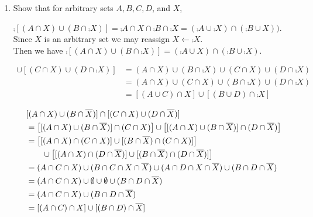 \documentclass[11pt]{book}
\begin{document}
\begin{enumerate}
\item Show that for arbitrary sets $A, B, C, D$, and $X$,
\begin{enumerate}
{$\comp{[(A \cap X) \cup (B \cap \comp{X})]} = \comp{A \cap X} \cap \comp{B \cap \comp{X}} = (\comp{A} \cup \comp{X}) \cap (\comp{B} \cup X))$.\\Since $X$ is an arbitrary set we may reassign $X \leftarrow \comp{X}$.\\Then we have $\comp{[(A \cap X) \cup (B \cap \comp{X})]} = (\comp{A} \cup X) \cap (\comp{B} \cup \comp{X})$.}

{\begin{align*}[(A \cap X) \cup (B \cap \comp{X})] \cup [(C \cap X) \cup (D \cap \comp{X})] &= (A \cap X) \cup (B \cap \comp{X}) \cup (C \cap X) \cup (D \cap \comp{X})\\&= (A \cap X) \cup (C \cap X) \cup (B \cap \comp{X}) \cup (D \cap \comp{X})\\&= [(A \cup C) \cap X] \cup [(B \cup D) \cap \comp{X}]\end{align*}}

{\begin{align*}&[(A \cap X) \cup (B \cap \overline{X})] \cap [(C \cap X) \cup (D \cap \overline{X})]\\ &= \left[[(A \cap X) \cup (B \cap \overline{X})] \cap (C \cap X)\right] \cup \left[[(A \cap X) \cup (B \cap \overline{X})] \cap (D \cap \overline{X})\right]\\&= \left[[(A \cap X) \cap (C \cap X)] \cup [(B \cap \overline{X}) \cap (C \cap X)]\right]\\&\hspace{0.7cm}\cup \left[[(A \cap X) \cap (D \cap \overline{X})] \cup [(B \cap \overline{X}) \cap (D \cap \overline{X})]\right] \\&= (A \cap C \cap X) \cup (B \cap C \cap X \cap \overline{X}) \cup (A \cap D \cap X \cap \overline{X}) \cup (B \cap D \cap \overline{X})\\&= (A \cap C \cap X) \cup \emptyset \cup \emptyset \cup (B \cap D \cap \overline{X}) \\&= (A \cap C \cap X) \cup (B \cap D \cap \overline{X}) \\&= [(A \cap C) \cap X] \cup [(B \cap D) \cap \overline{X}] \end{align*}}
\end{enumerate}


\end{enumerate}
\end{document}
